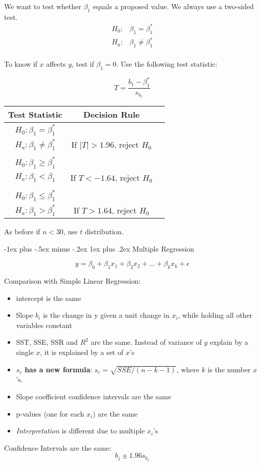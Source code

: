 \documentclass[10pt,landscape]{article}
\makeatletter
\renewcommand{\subsubsection}{\@startsection{subsubsection}{3}{0mm}%
                                {-1ex plus -.5ex minus -.2ex}%
                                {1ex plus .2ex}%
                                {\normalfont\small\bfseries}}
\makeatother
\begin{document}
\begin{multicols*}{3}
We want to test whether $\beta_1$ equals a proposed value. We always use a two-sided test.
\begin{align*}
H_0 : & \beta_1 = \beta_1^*\\
H_a : & \beta_1 \neq \beta_1^*\\
\end{align*}

To know if $x$ affects $y$, test if $\beta_1 = 0$.  Use the following test statistic:

\[
T = \frac{b_1 - \beta_1^*} {s_{b_1}}
\]

 \begin{tabular}{ c  c c }
Test Statistic & Decision Rule \\
\hline
$H_0 : \beta_1 = \beta_1^*$ \\      $H_a : \beta_1 \neq \beta_1^*$ & If $|T| > 1.96$, reject $H_0$ \\
 & \\
$H_0 : \beta_1 \geq \beta_1^*$ \\ $H_a : \beta_1 < \beta_1$      & If $T < -1.64$, reject $H_0$ \\
 & \\
$H_0 : \beta_1 \leq \beta_1^*$ \\ $H_a : \beta_1 > \beta_1^*$      & If $T > 1.64$, reject $H_0$ \\
\end{tabular}

As before if $n < 30$, use $t$ distribution. 



\subsubsection{Multiple Regression}

\[
y = \beta_0 + \beta_1 x_1 + \beta_2 x_2 + ... + \beta_k x_k + \epsilon
\]


Comparison with Simple Linear Regression:
\begin{itemize}
\item{intercept is the same}
\item{Slope $b_i$ is the change in y given a unit change in $x_i$, while holding all other variables constant}
\item{SST, SSE, SSR and $R^2$ are the same. Instead of variance of $y$ explain by a single $x$, it is explained by a set of $x$'s}
\item{$s_e$ \textbf{has a new formula}: $s_e = \sqrt{SSE / (n-k-1)} $}, where $k$ is the number $x$'s.
\item{Slope coefficient confidence intervals are the same}
\item{p-values (one for each $x_i$) are the same}
\item{\textit{Interpretation} is different due to multiple $x_i$'s}
\end{itemize}
Confidence Intervals are the same:
\[
b_j \pm 1.96 s_{b_j}
\]


\end{multicols*}
\end{document}
